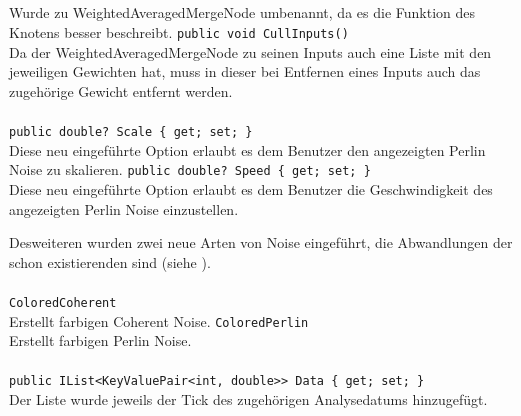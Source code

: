 \subsection{}

\paragraph{}
\begin{itemize}
	\change Wurde zu WeightedAveragedMergeNode umbenannt, da es die Funktion des Knotens besser beschreibt.
	\add \verb!public void CullInputs()! \\
	Da der WeightedAveragedMergeNode zu seinen Inputs auch eine Liste mit den jeweiligen Gewichten hat, muss in dieser bei Entfernen eines Inputs auch das zugehörige Gewicht entfernt werden.
\end{itemize}

\paragraph{}
\begin{itemize}
	\add \verb!public double? Scale { get; set; }! \\
	Diese neu eingeführte Option erlaubt es dem Benutzer den angezeigten Perlin Noise zu skalieren.
	\add \verb!public double? Speed { get; set; }! \\
	Diese neu eingeführte Option erlaubt es dem Benutzer die Geschwindigkeit des angezeigten Perlin Noise einzustellen.
\end{itemize}

Desweiteren wurden zwei neue Arten von Noise eingeführt, die Abwandlungen der schon existierenden sind (siehe ).

\paragraph{}
\begin{itemize}
	\add \verb!ColoredCoherent! \\
	Erstellt farbigen Coherent Noise.
	\add \verb!ColoredPerlin! \\
	Erstellt farbigen Perlin Noise.
\end{itemize}

\paragraph{}
\begin{itemize}
	\change \verb!public IList<KeyValuePair<int, double>> Data { get; set; }! \\
	Der Liste wurde jeweils der Tick des zugehörigen Analysedatums hinzugefügt.
\end{itemize}

